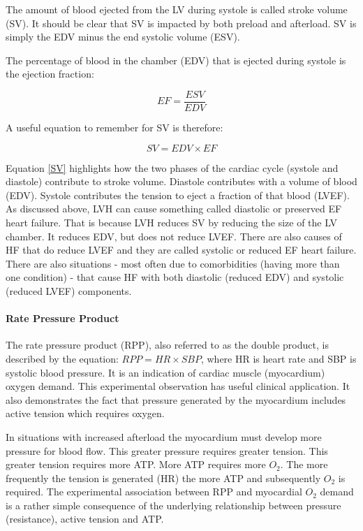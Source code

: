 The amount of blood ejected from the LV during systole is called stroke volume (SV). It should be clear that SV is impacted by both preload and afterload. SV is simply the EDV minus the end systolic volume (ESV). 

The percentage of blood in the chamber (EDV) that is ejected during systole is the ejection fraction: 

\begin{equation}
    EF = \frac{ESV}{EDV}
    \label{LVEF}
\end{equation}

A useful equation to remember for SV is therefore:

\begin{equation}
    SV = EDV \times EF
    \label{SV}
\end{equation}

Equation \ref{SV} highlights how the two phases of the cardiac cycle (systole and diastole) contribute to stroke volume. Diastole contributes with a volume of blood (EDV). Systole contributes the tension to eject a fraction of that blood (LVEF). As discussed above, LVH can cause something called diastolic or preserved EF heart failure. That is because LVH reduces SV by reducing the size of the LV chamber. It reduces EDV, but does not reduce LVEF. There are also causes of HF that do reduce LVEF and they are called systolic or reduced EF heart failure. There are also situations - most often due to comorbidities (having more than one condition) - that cause HF with both diastolic (reduced EDV) and systolic (reduced LVEF) components. 

\paragraph{Rate Pressure Product}

The rate pressure product (RPP), also referred to as the double product, is described by the equation: $RPP = HR \times SBP$, where HR is heart rate and SBP is systolic blood pressure. It is an indication of cardiac muscle (myocardium) oxygen demand. This experimental observation has useful clinical application. It also demonstrates the fact that pressure generated by the myocardium includes active tension which requires oxygen.

In situations with increased afterload the myocardium must develop more pressure for blood flow. This greater pressure requires greater tension. This greater tension requires more ATP. More ATP requires more $O_2$. The more frequently the tension is generated (HR) the more ATP and subsequently $O_2$ is required. The experimental association between RPP and myocardial $O_2$ demand is a rather simple consequence of the underlying relationship between pressure (resistance), active tension and ATP.

